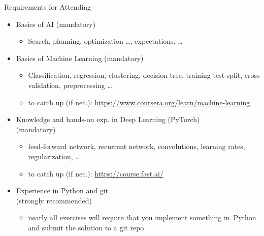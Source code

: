 \begin{frame}[c]{Requirements for Attending}
	
	\begin{itemize}
		\item Basics of \alert{AI} (mandatory)
		\begin{itemize}
			\item Search, planning, optimization \ldots, expectations, \ldots
		\end{itemize}
		\item Basics of \alert{Machine Learning} (mandatory)
		\begin{itemize}
			\item Classification, regression, clustering, decision tree, training-test split, cross validation, preprocessing \ldots
			\item to catch up (if nec.): \url{https://www.coursera.org/learn/machine-learning} 
		\end{itemize}
		\pause
		\item Knowledge and hands-on exp. in \alert{Deep Learning} (PyTorch)\\ (mandatory)
		\begin{itemize}
			\item feed-forward network, recurrent network, convolutions, learning rates, regularization, \ldots 
			\item to catch up (if nec.): \url{https://course.fast.ai/}
		\end{itemize}
		\pause
		\item Experience in \alert{Python and git}\\ (strongly recommended)
		\begin{itemize}
			\item nearly all exercises will require 
			that you implement something in~Python and submit the solution to a git repo
		\end{itemize}
	\end{itemize}
	
\end{frame}
